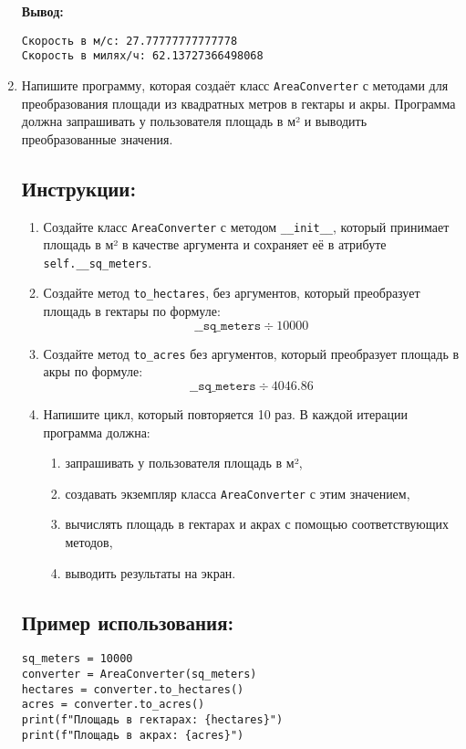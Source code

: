 \begin{enumerate}
\textbf{Вывод:}
\begin{verbatim}
Скорость в м/с: 27.77777777777778
Скорость в милях/ч: 62.13727366498068
\end{verbatim}

\item 

Напишите программу, которая создаёт класс \texttt{AreaConverter} с методами для преобразования площади
из квадратных метров в гектары и акры. Программа должна запрашивать у пользователя площадь в м²
и выводить преобразованные значения.

\subsection*{Инструкции:}
\begin{enumerate}
\item Создайте класс \texttt{AreaConverter} с методом
\texttt{\_\_init\_\_}, который принимает площадь в м² в
качестве аргумента и сохраняет её в атрибуте \texttt{self.\_\_sq\_meters}.

\item Создайте метод \texttt{to\_hectares},
без аргументов, который преобразует площадь в гектары по формуле:
\[
\texttt{\_\_sq\_meters} \div 10000
\]

\item Создайте метод \texttt{to\_acres} без аргументов,
который преобразует площадь в акры по формуле:
\[
\texttt{\_\_sq\_meters} \div 4046.86
\]

\item Напишите цикл, который повторяется 10 раз. В каждой итерации программа должна:
\begin{enumerate}
\item запрашивать у пользователя площадь в м²,
\item создавать экземпляр класса \texttt{AreaConverter} с этим значением,
\item вычислять площадь в гектарах и акрах с помощью соответствующих методов,
\item выводить результаты на экран.
\end{enumerate}
\end{enumerate}

\subsection*{Пример использования:}
\begin{verbatim}
sq_meters = 10000
converter = AreaConverter(sq_meters)
hectares = converter.to_hectares()
acres = converter.to_acres()
print(f"Площадь в гектарах: {hectares}")
print(f"Площадь в акрах: {acres}")
\end{verbatim}


\end{enumerate}
